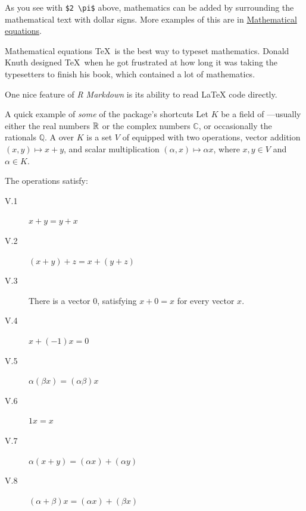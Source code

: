 \documentclass{beamer}
\begin{document}
\begin{frame}[fragile]
As you see with \texttt{\$2\ \textbackslash{}pi\$} above, mathematics
can be added by surrounding the mathematical text with dollar signs.
More examples of this are in
\protect\hyperlink{mathematical-equations}{Mathematical equations}.
\end{frame}

\begin{frame}{Mathematical equations}
\protect\hypertarget{mathematical-equations}{}
\TeX~is the best way to typeset mathematics. Donald Knuth designed
\TeX~when he got frustrated at how long it was taking the typesetters to
finish his book, which contained a lot of mathematics.

One nice feature of \emph{R Markdown} is its ability to read LaTeX code
directly.
\end{frame}

\begin{frame}
\begin{block}{A quick example of \emph{some} of the package's shortcuts}
\protect\hypertarget{a-quick-example-of-some-of-the-packages-shortcuts}{}
Let \(K\) be a field of
---usually either the
real numbers \(\mathbb R\) or the complex numbers \(\mathbb C\), or
occasionally the rationals \(\mathbb Q\). A  over
\(K\) is a set \(V\) of  equipped with two
operations, vector addition \((x,y)\mapsto x+y\), and scalar
multiplication \((\alpha,x)\mapsto \alpha x\), where \(x,y\in V\) and
\(\alpha\in K\).
\end{block}
\end{frame}

\begin{frame}
The operations satisfy:

\begin{description}
\item[V.1] $x+y=y+x$
\item[V.2] $(x+y)+z=x+(y+z)$
\item[V.3] There is a vector $0$, satisfying $x+0=x$ for every vector $x$.
\item[V.4] $x+(-1)x=0$
\item[V.5] $\alpha(\beta x)=(\alpha \beta)x$
\item[V.6] $1x=x$
\item[V.7] $\alpha(x+y)=(\alpha x)+(\alpha y)$
\item[V.8] $(\alpha+\beta)x=(\alpha x)+(\beta x)$
\end{description}
\end{frame}
\end{document}
